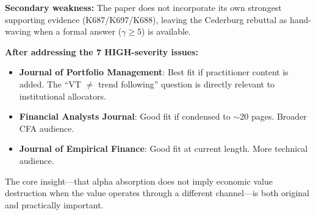 \documentclass[12pt,a4paper]{article}
\begin{document}
\textbf{Secondary weakness:} The paper does not incorporate its own strongest supporting evidence (K687/K697/K688), leaving the Cederburg rebuttal as hand-waving when a formal answer ($\gamma \geq 5$) is available.

\textbf{After addressing the 7 HIGH-severity issues:}
\begin{itemize}
    \item \textbf{Journal of Portfolio Management}: Best fit if practitioner content is added. The ``VT $\neq$ trend following'' question is directly relevant to institutional allocators.
    \item \textbf{Financial Analysts Journal}: Good fit if condensed to $\sim$20 pages. Broader CFA audience.
    \item \textbf{Journal of Empirical Finance}: Good fit at current length. More technical audience.
\end{itemize}

The core insight---that alpha absorption does not imply economic value destruction when the value operates through a different channel---is both original and practically important.
\end{document}

